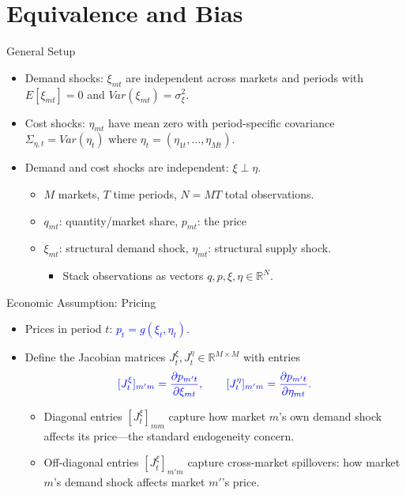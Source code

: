 \documentclass[notes,11pt, aspectratio=169]{beamer}
\begin{document}
\section{Equivalence and Bias}

\begin{frame}{General Setup}


\begin{itemize}
    \item Demand shocks: $\xi_{mt}$ are independent across markets and periods with $E[\xi_{mt}] = 0$ and $Var(\xi_{mt}) = \sigma_\xi^2$.
    \item Cost shocks: $\eta_{mt}$ have mean zero with period-specific covariance $\Sigma_{\eta,t} = Var(\eta_t)$ where $\eta_t = (\eta_{1t}, \ldots, \eta_{Mt})$. 
    \item Demand and cost shocks are independent: $\xi \perp \eta$.
    \begin{itemize}
    \item $M$ markets, $T$ time periods, $N = MT$ total observations. 
    \item $q_{mt}$: quantity/market share, $p_{mt}$: the price
    \item $\xi_{mt}$: structural demand shock, $\eta_{mt}$: structural supply shock. 
\begin{itemize}
        \item Stack observations as vectors $q, p, \xi, \eta \in \mathbb{R}^N$.
\end{itemize}
\end{itemize}
\end{itemize}
    
\end{frame}

\begin{frame}{Economic Assumption: Pricing}

\begin{itemize}
    \item Prices in period $t$: \textcolor{blue}{$p_t = g(\xi_t, \eta_t)$.}

    \item Define the Jacobian matrices $J_t^\xi, J_t^\eta \in \mathbb{R}^{M \times M}$ with entries
\begin{equation*}
    \textcolor{blue}{[J_t^\xi]_{m'm} = \frac{\partial p_{m't}}{\partial \xi_{mt}}, \qquad [J_t^\eta]_{m'm} = \frac{\partial p_{m't}}{\partial \eta_{mt}}.}
\end{equation*}

\begin{itemize}
    \item Diagonal entries $[J_t^\xi]_{mm}$ capture how market $m$'s own demand shock affects its price—the standard endogeneity concern. 

    \item Off-diagonal entries $[J_t^\xi]_{m'm}$ capture cross-market spillovers: how market $m$'s demand shock affects market $m'$'s price.
\end{itemize}
\end{itemize}
    
\end{frame}
\end{document}
